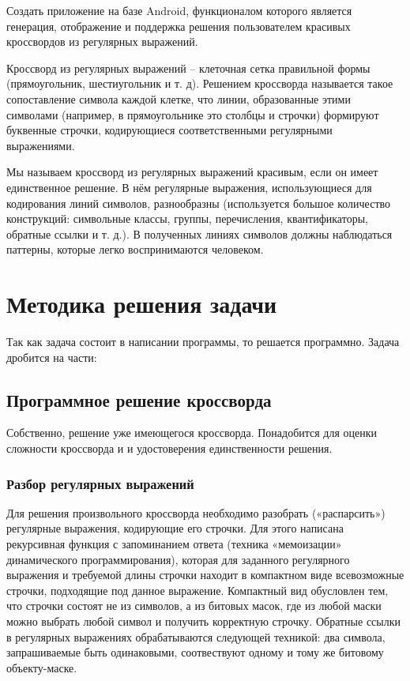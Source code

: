 \documentclass[12pt]{report}
\begin{document}
   Создать приложение на базе Android, функционалом которого является генерация, отображение и поддержка решения пользователем красивых кроссвордов из регулярных выражений.
   
   Кроссворд из регулярных выражений -- клеточная сетка правильной формы (прямоугольник, шестиугольник и т. д). Решением кроссворда называется такое сопоставление символа каждой клетке, что линии, образованные этими символами (например, в прямоугольнике это столбцы и строчки) формируют буквенные строчки, кодирующиеся соответственными регулярными выражениями.
   
   Мы называем кроссворд из регулярных выражений красивым, если он имеет единственное решение. В нём регулярные выражения, использующиеся для кодирования линий символов, разнообразны (используется большое количество конструкций: символьные классы, группы, перечисления, квантификаторы, обратные ссылки и т. д.). В полученных линиях символов должны наблюдаться паттерны, которые легко воспринимаются человеком.


    \newpage %
\chapter{Методика решения задачи}

Так как задача состоит в написании программы, то решается программно. Задача дробится на части: 
\section{Программное решение кроссворда}
Собственно, решение уже имеющегося кроссворда. Понадобится для оценки сложности кроссворда и и удостоверения единственности решения.
\subsection{Разбор регулярных выражений} Для решения произвольного кроссворда необходимо разобрать («распарсить») регулярные выражения, кодирующие его строчки. Для этого написана рекурсивная функция с запоминанием ответа (техника «мемоизации» динамического программирования), которая для заданного регулярного выражения и требуемой длины строчки находит в компактном виде всевозможные строчки, подходящие под данное выражение. Компактный вид обусловлен тем, что строчки состоят не из символов, а из битовых масок, где из любой маски можно выбрать любой символ и получить корректную строчку. Обратные ссылки в регулярных выражениях обрабатываются следующей техникой: два символа, запрашиваемые быть одинаковыми, соотвествуют одному и тому же битовому объекту-маске.
\end{document}
